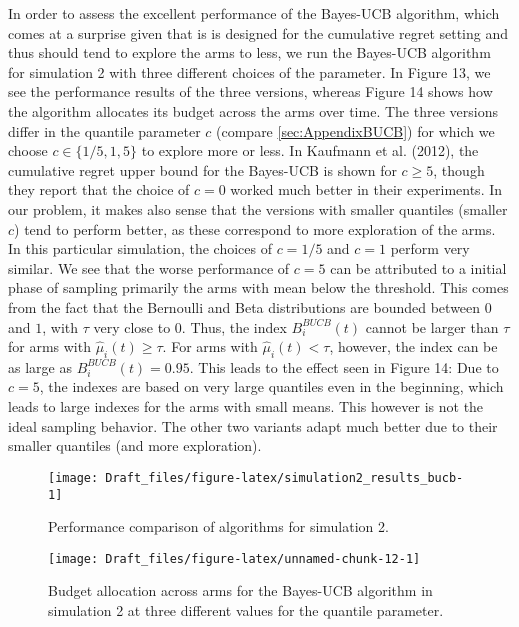 \documentclass[11pt,]{article}
\begin{document}
In order to assess the excellent performance of the Bayes-UCB algorithm,
which comes at a surprise given that is is designed for the cumulative
regret setting and thus should tend to explore the arms to less, we run
the Bayes-UCB algorithm for simulation 2 with three different choices of
the parameter. In Figure 13, we see the performance results of the three
versions, whereas Figure 14 shows how the algorithm allocates its budget
across the arms over time. The three versions differ in the quantile
parameter \(c\) (compare \autoref{sec:AppendixBUCB}) for which we choose
\(c \in \{1/5, 1, 5\}\) to explore more or less. In Kaufmann et al.
(2012), the cumulative regret upper bound for the Bayes-UCB is shown for
\(c\geq 5\), though they report that the choice of \(c=0\) worked much
better in their experiments. In our problem, it makes also sense that
the versions with smaller quantiles (smaller \(c\)) tend to perform
better, as these correspond to more exploration of the arms. In this
particular simulation, the choices of \(c=1/5\) and \(c=1\) perform very
similar. We see that the worse performance of \(c=5\) can be attributed
to a initial phase of sampling primarily the arms with mean below the
threshold. This comes from the fact that the Bernoulli and Beta
distributions are bounded between \(0\) and \(1\), with \(\tau\) very
close to \(0\). Thus, the index \(B_i^{BUCB}(t)\) cannot be larger than
\(\tau\) for arms with \(\hat{\mu}_i(t) \geq \tau\). For arms with
\(\hat{\mu}_i(t) < \tau\), however, the index can be as large as
\(B_i^{BUCB}(t) = 0.95\). This leads to the effect seen in Figure 14:
Due to \(c=5\), the indexes are based on very large quantiles even in
the beginning, which leads to large indexes for the arms with small
means. This however is not the ideal sampling behavior. The other two
variants adapt much better due to their smaller quantiles (and more
exploration).

\begin{figure}

{\centering \texttt{[image: Draft\_files/figure-latex/simulation2\_results\_bucb-1]} 

}

\caption{Performance comparison of algorithms for simulation 2.}\label{fig:simulation2_results_bucb}
\end{figure}

\begin{figure}

{\centering \texttt{[image: Draft\_files/figure-latex/unnamed-chunk-12-1]} 

}

\caption{Budget allocation across arms for the Bayes-UCB algorithm in simulation 2 at three different values for the quantile parameter.}\label{fig:unnamed-chunk-12}
\end{figure}
\end{document}
